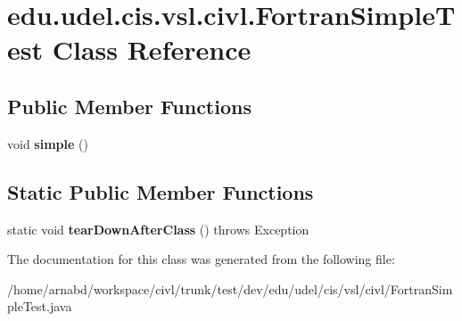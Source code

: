 \hypertarget{classedu_1_1udel_1_1cis_1_1vsl_1_1civl_1_1FortranSimpleTest}{}\section{edu.\+udel.\+cis.\+vsl.\+civl.\+Fortran\+Simple\+Test Class Reference}
\label{classedu_1_1udel_1_1cis_1_1vsl_1_1civl_1_1FortranSimpleTest}
\subsection*{Public Member Functions}
\begin{DoxyCompactItemize}
\item 
\hypertarget{classedu_1_1udel_1_1cis_1_1vsl_1_1civl_1_1FortranSimpleTest_aec79896cfcd908d6d1070251877e64c8}{}void {\bfseries simple} ()\label{classedu_1_1udel_1_1cis_1_1vsl_1_1civl_1_1FortranSimpleTest_aec79896cfcd908d6d1070251877e64c8}

\end{DoxyCompactItemize}
\subsection*{Static Public Member Functions}
\begin{DoxyCompactItemize}
\item 
\hypertarget{classedu_1_1udel_1_1cis_1_1vsl_1_1civl_1_1FortranSimpleTest_aea2dd7333f5fe915213de40bebf502d0}{}static void {\bfseries tear\+Down\+After\+Class} ()  throws Exception \label{classedu_1_1udel_1_1cis_1_1vsl_1_1civl_1_1FortranSimpleTest_aea2dd7333f5fe915213de40bebf502d0}

\end{DoxyCompactItemize}


The documentation for this class was generated from the following file\+:\begin{DoxyCompactItemize}
\item 
/home/arnabd/workspace/civl/trunk/test/dev/edu/udel/cis/vsl/civl/Fortran\+Simple\+Test.\+java\end{DoxyCompactItemize}
